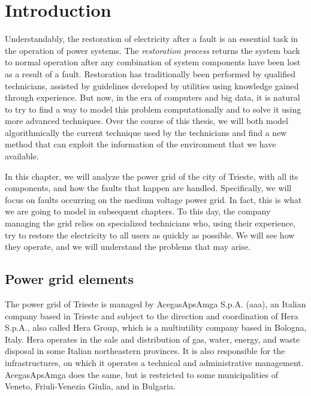 \chapter{Introduction}


Understandably, the restoration of electricity after a fault is an essential task in the operation of power systems. The \emph{restoration process} returns the system back to normal operation after any combination of system components have been lost as a result of a fault. Restoration has traditionally been performed by qualified technicians, assisted by guidelines developed by utilities using knowledge gained through experience. But now, in the era of computers and big data, it is natural to try to find a way to model this problem computationally and to solve it using more advanced techniques. Over the course of this thesis, we will both model algorithmically the current technique used by the technicians and find a new method that can exploit the information of the environment that we have available.

In this chapter, we will analyze the power grid of the city of Trieste, with all its components, and how the faults that happen are handled. Specifically, we will focus on faults occurring on the medium voltage power grid. In fact, this is what we are going to model in subsequent chapters. To this day, the company managing the grid relies on specialized technicians who, using their experience, try to restore the electricity to all users as quickly as possible. We will see how they operate, and we will understand the problems that may arise.


\section{Power grid elements}

The power grid of Trieste is managed by AcegasApsAmga S.p.A. (\acrshort{aaa}), an Italian company based in Trieste and subject to the direction and coordination of Hera S.p.A., also called Hera Group, which is a multiutility company based in Bologna, Italy. Hera operates in the sale and distribution of gas, water, energy, and waste disposal in some Italian northeastern provinces. It is also responsible for the infrastructures, on which it operates a technical and administrative management. AcegasApsAmga does the same, but is restricted to some municipalities of Veneto, Friuli-Venezia Giulia, and in Bulgaria.

